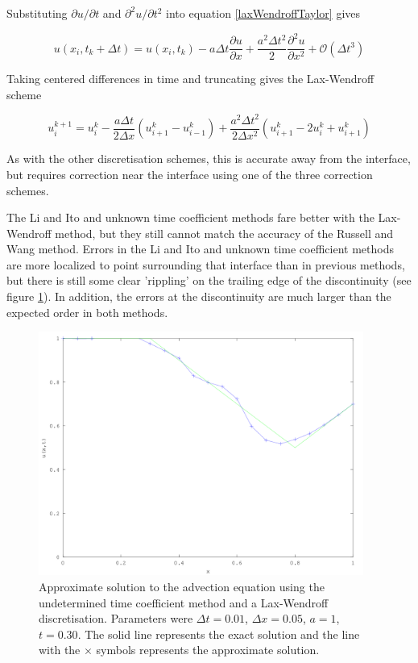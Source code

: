 Substituting $\partial u / \partial t$ and $\partial^2 u / \partial t^2$ into equation \ref{laxWendroffTaylor} gives

\begin{equation}
    u(x_i,t_k+\Delta t) = u(x_i,t_k) - a \Delta t \frac{\partial u}{\partial x} + \frac{a^2 \Delta t^2}{2} \frac{\partial^2 u}{\partial x^2} + \mathcal{O}(\Delta t^3)
\end{equation}

Taking centered differences in time and truncating gives the Lax-Wendroff scheme

\begin{equation}
    u_i^{k+1} = u_i^k - \frac{a \Delta t}{2 \Delta x} \left(u_{i+1}^k - u_{i-1}^k\right) + \frac{a^2 \Delta t^2}{2 \Delta x^2} \left(u_{i+1}^k - 2 u_i^k + u_{i+1}^k \right)
\end{equation}

As with the other discretisation schemes, this is accurate away from the interface, but requires correction near the interface using one of the three correction schemes.

The Li and Ito and unknown time coefficient methods fare better with the Lax-Wendroff method, but they still cannot match the accuracy of the Russell and Wang method.
Errors in the Li and Ito and unknown time coefficient methods are more localized to point surrounding that interface than in previous methods, but there is still some clear 'rippling' on the trailing edge of the discontinuity (see figure \ref{timeCoeffLW}).
In addition, the errors at the discontinuity are much larger than the expected order in both methods.

\begin{figure}[h]
    \centering
    \includegraphics[width=0.95\textwidth]{diagrams/timeCoeffLW}
    \caption{Approximate solution to the advection equation using the undetermined time coefficient method and a Lax-Wendroff discretisation.
    Parameters were $\Delta t = 0.01$, $\Delta x = 0.05$, $a = 1$, $t = 0.30$.
    The solid line represents the exact solution and the line with the $\times$ symbols represents the approximate solution.}
    \label{timeCoeffLW}
\end{figure}
